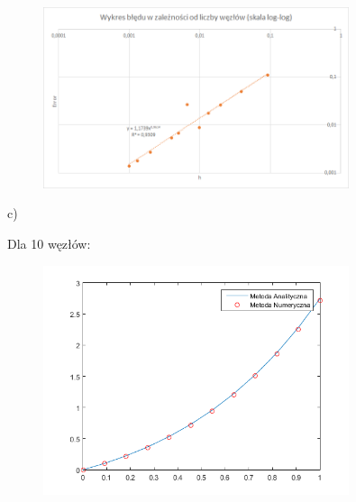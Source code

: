 \begin{samepage}
	
	\FloatBarrier
	\begin{figure}[!ht]
		\begin{center}
			\includegraphics[width=0.8\textwidth]{Lab4/charts/zad4/b/error.png}
		\end{center}
	\end{figure}
	\FloatBarrier
\end{samepage}

\newpage

c)

\begin{samepage}
	Dla 10 węzłów:
	
	\FloatBarrier
	\begin{figure}[!ht]
		\begin{center}
			\includegraphics[width=0.8\textwidth]{Lab4/charts/zad4/c/10.png}
		\end{center}
	\end{figure}
	\FloatBarrier
\end{samepage}

